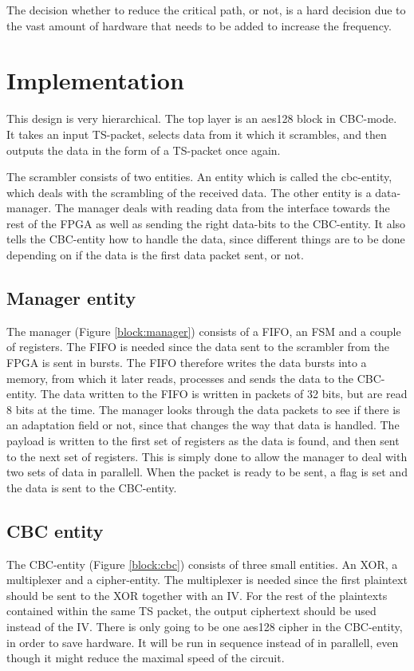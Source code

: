 The decision whether to reduce the critical path, or not, is a hard 
decision due to the vast amount of hardware that needs to be added to
increase the frequency.

\section{Implementation}
This design is very hierarchical. The top layer is an aes128 block in 
CBC-mode. It takes an input TS-packet, selects data from it which it 
scrambles, and then outputs the data in the form of a TS-packet once 
again.

The scrambler consists of two entities. An entity which is called the 
cbc-entity, which deals with the scrambling of the received data. The 
other entity is a data-manager. The manager deals with reading data 
from the interface towards the rest of the FPGA as well as sending the 
right data-bits to the CBC-entity. It also tells the CBC-entity how to 
handle the data, since different things are to be done depending on if 
the data is the first data packet sent, or not.

\subsection{Manager entity}
The manager (Figure \ref{block:manager}) consists of a FIFO, an FSM and 
a couple of registers. The FIFO is needed since the data sent to the 
scrambler from the FPGA is sent in bursts. The FIFO therefore writes 
the data bursts into a memory, from which it later reads, processes and 
sends the data to the CBC-entity. The data written to the FIFO is 
written in packets of 32 bits, but are read 8 bits at the time. The 
manager looks through the data packets to see if there is an adaptation 
field or not, since that changes the way that data is handled. The 
payload is written to the first set of registers as the data is found, 
and then sent to the next set of registers. This is simply done to 
allow the manager to deal with two sets of data in parallell. When the 
packet is ready to be sent, a flag is set and the data is sent to the 
CBC-entity. 

\subsection{CBC entity}
The CBC-entity (Figure \ref{block:cbc}) consists of three small 
entities. An XOR, a multiplexer and a cipher-entity. The multiplexer is 
needed since the first plaintext should be sent to the XOR together 
with an IV. For the rest of the plaintexts contained within the same 
TS packet, the output ciphertext should be used instead of the IV. 
There is only going to be one aes128 cipher in the CBC-entity, in order 
to save hardware. It will be run in sequence instead of in parallell, 
even though it might reduce the maximal speed of the circuit.

